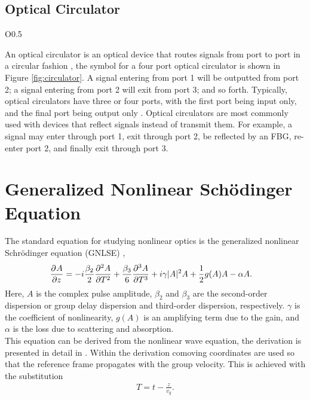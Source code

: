 \subsection{Optical Circulator}
\begin{wrapfigure}{O}{0.5\textwidth}
\centering

\caption[Optical Circulator]{Symbol for a four port optical circulator.}
\label{fig:circulator}
\end{wrapfigure}
%
An optical circulator is an optical device that routes signals from port to port in a circular fashion \cite{agrawal2002, alazzawi}, the symbol for a four port optical circulator is shown in Figure \ref{fig:circulator}. A signal entering from port 1 will be outputted from port 2; a signal entering from port 2 will exit from port 3; and so forth. Typically, optical circulators have three or four ports, with the first port being input only, and the final port being output only \cite{alazzawi}. Optical circulators are most commonly used with devices that reflect signals instead of transmit them. For example, a signal may enter through port 1, exit through port 2, be reflected by an FBG, re-enter port 2, and finally exit through port 3.

\section{Generalized Nonlinear Sch\"odinger Equation}
The standard equation for studying nonlinear optics is the generalized nonlinear Schr\"odinger equation (GNLSE) \cite{agrawal2013, burgoyne2007, ferreira, peng, shtyrina, yarutkina},
\begin{align}
\label{eq:nlse}
\pdiff{A}{z} &= - i \frac{\beta_2}{2}\pdiff[2]{A}{T} + \frac{\beta_3}{6}\pdiff[3]{A}{T} + i \gamma |A|^2 A + \frac{1}{2}g(A) A - \alpha A.
\end{align}
Here, $A$ is the complex pulse amplitude, $\beta_2$ and $\beta_3$ are the second-order dispersion or group delay dispersion and third-order dispersion, respectively. $\gamma$ is the coefficient of nonlinearity, $g(A)$ is an amplifying term due to the gain, and $\alpha$ is the loss due to scattering and absorption. \\

This equation can be derived from the nonlinear wave equation, the derivation is presented in detail in \cite{agrawal2013, ferreira}. Within the derivation comoving coordinates are used so that the reference frame propagates with the group velocity. This is achieved with the substitution
\begin{align*}
T = t - \frac{z}{v_g}.
\end{align*}

